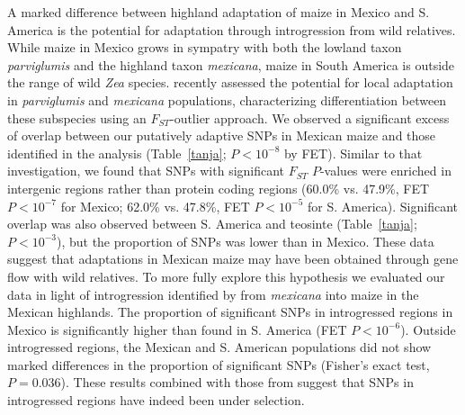 {{A marked difference between highland adaptation of maize in Mexico and S. America is the potential for adaptation through introgression from wild relatives.  
While maize in Mexico grows in sympatry with both the lowland taxon \textit{parviglumis} and the highland taxon \textit{mexicana}, maize in South America is outside the range of wild \textit{Zea} species.
\citet{Pyhajarvi2013} recently assessed the potential for local adaptation in \textit{parviglumis} and \textit{mexicana} populations, characterizing differentiation between these subspecies using an $F_{ST}$-outlier approach.
We observed a significant excess of overlap between our putatively adaptive SNPs in Mexican maize and those identified in the \citet{Pyhajarvi2013} analysis (Table~\ref{tanja}; $P<10^{-8}$ by FET). 
Similar to that investigation, we found that SNPs with significant $F_{ST}$ $P$-values were enriched in intergenic regions rather than protein coding regions (60.0\% vs. 47.9\%, FET $P < 10^{-7}$ for Mexico; 62.0\% vs. 47.8\%, FET $P<10^{-5}$ for S. America). 
Significant overlap was also observed between S. America and teosinte (Table~\ref{tanja}; $P<10^{-3}$), but the proportion of SNPs was lower than in Mexico.
These data suggest that adaptations in Mexican maize may have been obtained through gene flow with wild relatives.  To more fully explore this hypothesis we evaluated our data in light of introgression identified by \citet{Profford_2013} from \textit{mexicana} into maize in the Mexican highlands.  
The proportion of significant SNPs in introgressed regions in Mexico is significantly higher than found in S. America (FET $P<10^{-6}$).
Outside introgressed regions, the Mexican and S. American populations did not show marked differences in the proportion of significant SNPs (Fisher's exact test, $P=0.036$). These results combined with those from \citet{Profford_2013} suggest that SNPs in introgressed regions have indeed been under selection.  

}}
